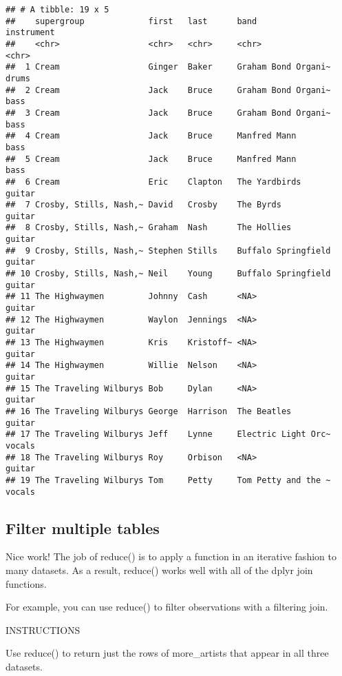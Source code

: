 \documentclass[]{article}
\newenvironment{Shaded}{\begin{snugshade}}{\end{snugshade}}
\newcommand{\KeywordTok}[1]{\textcolor[rgb]{0.13,0.29,0.53}{\textbf{#1}}}
\newcommand{\DataTypeTok}[1]{\textcolor[rgb]{0.13,0.29,0.53}{#1}}
\newcommand{\StringTok}[1]{\textcolor[rgb]{0.31,0.60,0.02}{#1}}
\newcommand{\CommentTok}[1]{\textcolor[rgb]{0.56,0.35,0.01}{\textit{#1}}}
\newcommand{\OperatorTok}[1]{\textcolor[rgb]{0.81,0.36,0.00}{\textbf{#1}}}
\newcommand{\NormalTok}[1]{#1}
\begin{document}
\begin{verbatim}
## # A tibble: 19 x 5
##    supergroup             first   last      band                instrument
##    <chr>                  <chr>   <chr>     <chr>               <chr>     
##  1 Cream                  Ginger  Baker     Graham Bond Organi~ drums     
##  2 Cream                  Jack    Bruce     Graham Bond Organi~ bass      
##  3 Cream                  Jack    Bruce     Graham Bond Organi~ bass      
##  4 Cream                  Jack    Bruce     Manfred Mann        bass      
##  5 Cream                  Jack    Bruce     Manfred Mann        bass      
##  6 Cream                  Eric    Clapton   The Yardbirds       guitar    
##  7 Crosby, Stills, Nash,~ David   Crosby    The Byrds           guitar    
##  8 Crosby, Stills, Nash,~ Graham  Nash      The Hollies         guitar    
##  9 Crosby, Stills, Nash,~ Stephen Stills    Buffalo Springfield guitar    
## 10 Crosby, Stills, Nash,~ Neil    Young     Buffalo Springfield guitar    
## 11 The Highwaymen         Johnny  Cash      <NA>                guitar    
## 12 The Highwaymen         Waylon  Jennings  <NA>                guitar    
## 13 The Highwaymen         Kris    Kristoff~ <NA>                guitar    
## 14 The Highwaymen         Willie  Nelson    <NA>                guitar    
## 15 The Traveling Wilburys Bob     Dylan     <NA>                guitar    
## 16 The Traveling Wilburys George  Harrison  The Beatles         guitar    
## 17 The Traveling Wilburys Jeff    Lynne     Electric Light Orc~ vocals    
## 18 The Traveling Wilburys Roy     Orbison   <NA>                guitar    
## 19 The Traveling Wilburys Tom     Petty     Tom Petty and the ~ vocals
\end{verbatim}

\subsection{Filter multiple tables}\label{filter-multiple-tables}

Nice work! The job of reduce() is to apply a function in an iterative
fashion to many datasets. As a result, reduce() works well with all of
the dplyr join functions.

For example, you can use reduce() to filter observations with a
filtering join.

INSTRUCTIONS

Use reduce() to return just the rows of more\_artists that appear in all
three datasets.

\begin{Shaded}
\end{Shaded}
\end{document}
